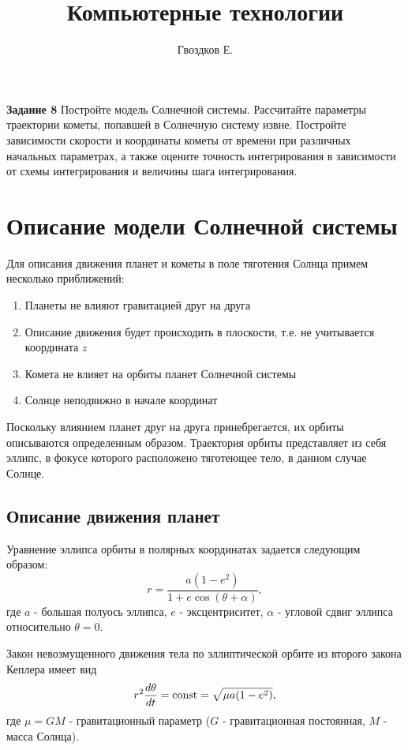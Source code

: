 



\title{Компьютерные технологии}
\author{Гвоздков Е.}




\maketitle

\textbf{Задание 8} Постройте модель Солнечной системы. Рассчитайте параметры траектории кометы,
попавшей в Солнечную систему извне. Постройте зависимости скорости и координаты кометы
от времени при различных начальных параметрах, а также оцените точность интегрирования в
зависимости от схемы интегрирования и величины шага интегрирования.

\section{Описание модели Солнечной системы}
Для описания движения планет и кометы в поле тяготения Солнца примем несколько приближений:
\begin{enumerate}
	\item Планеты не влияют гравитацией друг на друга
	\item Описание движения будет происходить в плоскости, т.е. не учитывается координата $z$
	\item Комета не влияет на орбиты планет Солнечной системы
	\item Солнце неподвижно в начале координат
\end{enumerate}
Поскольку влиянием планет друг на друга принебрегается, их орбиты описываются определенным образом.
Траектория орбиты представляет из себя эллипс, в фокусе которого расположено тяготеющее тело, в данном случае Солнце.

\subsection{Описание движения планет}
Уравнение эллипса орбиты в полярных координатах задается следующим образом:
\begin{equation}
	r = \frac{a(1-e^2)}{1 + e \cos(\theta + \alpha)},
\end{equation}
где $a$ - большая полуось эллипса, $e$ - эксцентриситет, $\alpha$ - угловой сдвиг
эллипса относительно $\theta=0$.

Закон невозмущенного движения тела по эллиптической орбите из второго закона Кеплера имеет вид
\begin{equation}
	r^2\frac{d\theta}{d t} = \text{\rmfamily\upshape const} = \sqrt{\mu a (1-e^2)},
\end{equation}
где $\mu = GM$ - гравитационный параметр ($G$ - гравитационная постоянная, $M$ - масса Солнца).

